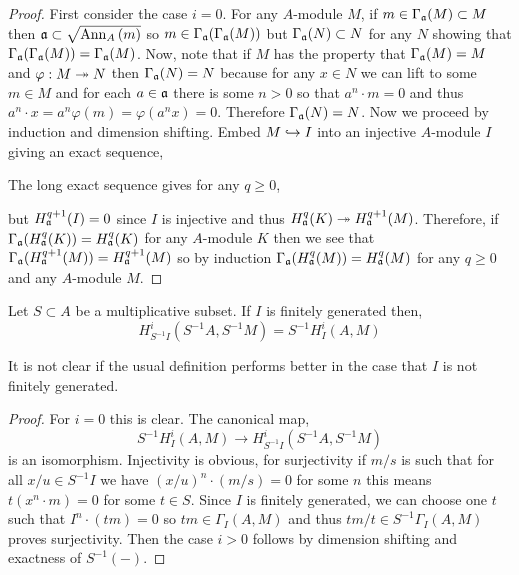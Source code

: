 \documentclass[12pt]{article}
\begin{document}
\begin{proof}
First consider the case $i = 0$. For any $A$-module $M$, if $m \in \Gamma_{\mathfrak{a}}(M) \subset M$ then $\mathfrak{a} \subset \sqrt{\mathrm{Ann}_{A}\left(m\right)}$ so $m \in \Gamma_{\mathfrak{a}}(\Gamma_{\mathfrak{a}}(M))$ but $\Gamma_{\mathfrak{a}}(N) \subset N$ for any $N$ showing that $\Gamma_{\mathfrak{a}}(\Gamma_{\mathfrak{a}}(M)) = \Gamma_{\mathfrak{a}}(M)$. Now, note that if $M$ has the property that $\Gamma_{\mathfrak{a}}(M) = M$ and $\varphi : M \twoheadrightarrow N$ then $\Gamma_{\mathfrak{a}}(N) = N$ because for any $x \in N$ we can lift to some $m \in M$ and for each $a \in \mathfrak{a}$ there is some $n > 0$ so that $a^n \cdot m = 0$ and thus $a^n \cdot x = a^n \varphi(m) = \varphi(a^n x) = 0$. Therefore $\Gamma_{\mathfrak{a}}(N) = N$. Now we proceed by induction and dimension shifting. Embed $M \hookrightarrow I$ into an injective $A$-module $I$ giving an exact sequence,
\begin{center}
\end{center}
The long exact sequence gives for any $q \ge 0$,
\begin{center}
\end{center}
but $H^{q+1}_{\mathfrak{a}}(I) = 0$ since $I$ is injective and thus $H^q_{\mathfrak{a}}(K) \twoheadrightarrow H^{q+1}_{\mathfrak{a}}(M)$. Therefore, if $\Gamma_{\mathfrak{a}}(H^q_{\mathfrak{a}}(K)) = H^q_{\mathfrak{a}}(K)$ for any $A$-module $K$ then we see that $\Gamma_{\mathfrak{a}}(H^{q+1}_{\mathfrak{a}}(M)) = H^{q+1}_{\mathfrak{a}}(M)$ so by induction $\Gamma_{\mathfrak{a}}(H^{q}_{\mathfrak{a}}(M)) = H^q_{\mathfrak{a}}(M)$ for any $q \ge 0$ and any $A$-module $M$.
\end{proof}

\begin{lemma}
Let $S \subset A$ be a multiplicative subset. If $I$ is finitely generated then,
\[ H^i_{S^{-1} I}(S^{-1} A, S^{-1} M) = S^{-1} H^i_I(A, M) \]
\end{lemma}

\begin{rmk}
It is not clear if the usual definition performs better in the case that $I$ is not finitely generated.  
\end{rmk}

\begin{proof}
For $i = 0$ this is clear. The canonical map,
\[ S^{-1} H^i_I(A, M) \to H^i_{S^{-1} I}(S^{-1} A, S^{-1} M) \]
is an isomorphism. Injectivity is obvious, for surjectivity if $m/s$ is such that for all $x/u \in S^{-1} I$ we have $(x/u)^n \cdot (m/s) = 0$ for some $n$ this means $t(x^n \cdot m) = 0$ for some $t \in S$. Since $I$ is finitely generated, we can choose one $t$ such that $I^n \cdot (tm) = 0$ so $tm \in \Gamma_I(A, M)$ and thus $tm/t \in S^{-1} \Gamma_I(A, M)$ proves surjectivity. Then the case $i > 0$ follows by dimension shifting and exactness of $S^{-1}(-)$.
\end{proof}
\end{document}
